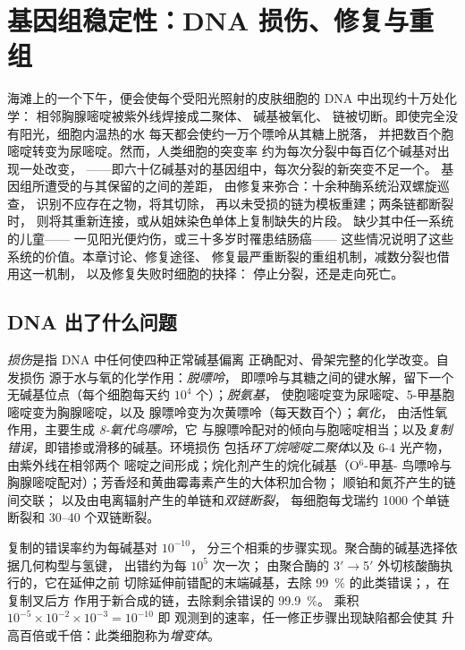 \chapter{基因组稳定性：DNA 损伤、修复与重组}\label{ch:b3:dna-repair}

海滩上的一个下午，便会使每个受阳光照射的皮肤细胞的 DNA 中出现约十万处化学：
相邻胸腺嘧啶被紫外线焊接成二聚体、
碱基被氧化、
链被切断。即使完全没有阳光，细胞内温热的水
每天都会使约一万个嘌呤从其糖上脱落，
并把数百个胞嘧啶转变为尿嘧啶。然而，人类细胞的突变率
约为每次分裂中每百亿个碱基对出现一处改变，
——即六十亿碱基对的基因组中，每次分裂的新突变不足一个。
基因组所遭受的与其保留的之间的差距，
由修复来弥合：十余种酶系统沿双螺旋巡查，
识别不应存在之物，将其切除，
再以未受损的链为模板重建；两条链都断裂时，
则将其重新连接，或从姐妹染色单体上复制缺失的片段。
缺少其中任一系统的儿童——
一见阳光便灼伤，或三十多岁时罹患结肠癌——
这些情况说明了这些系统的价值。本章讨论、修复途径、
修复最严重断裂的重组机制，减数分裂也借用这一机制，
以及修复失败时细胞的抉择：
停止分裂，还是走向死亡。

\section{DNA 出了什么问题}

\begin{definition}[DNA 损伤]\label{def:b3:dna-repair:lesions}
\emph{损伤}是指 DNA 中任何使四种正常碱基偏离
正确配对、骨架完整的化学改变。自发损伤
源于水与氧的化学作用：\emph{脱嘌呤}，
即嘌呤与其糖之间的键水解，留下一个
无碱基位点（每个细胞每天约 $10^{4}$ 个）；\emph{脱氨基}，
使胞嘧啶变为尿嘧啶、5-甲基胞嘧啶变为胸腺嘧啶，以及
腺嘌呤变为次黄嘌呤（每天数百个）；\emph{氧化}，
由活性氧作用，主要生成 \emph{8-氧代鸟嘌呤}，它
与腺嘌呤配对的倾向与胞嘧啶相当；以及\emph{复制
错误}，即错掺或滑移的碱基。环境损伤
包括\emph{环丁烷嘧啶二聚体}以及 6-4
光产物，由紫外线在相邻两个
嘧啶之间形成；烷化剂产生的烷化碱基（O$^{6}$-甲基-
鸟嘌呤与胸腺嘧啶配对）；芳香烃和黄曲霉毒素产生的大体积加合物；
顺铂和氮芥产生的链间交联；
以及由电离辐射产生的单链和\emph{双链断裂}，
每细胞每戈瑞约 \num{1000} 个单链断裂和
\numrange{30}{40} 个双链断裂。
\end{definition}

\begin{proposition}[保真度阶梯]\label{prop:b3:dna-repair:fidelity}
复制的错误率约为每碱基对 $10^{-10}$，
分三个相乘的步骤实现。聚合酶的碱基选择依据几何构型与氢键，
出错约为每 $10^{5}$ 次一次；
由聚合酶的 3$'\to$5$'$ 外切核酸酶执行的\emph{}，它在延伸之前
切除延伸前错配的末端碱基，去除
\qty{99}{\%} 的此类错误；\emph{}，在复制叉后方
作用于新合成的链，去除剩余错误的 \qty{99.9}{\%}。
乘积 $10^{-5}\times 10^{-2}\times 10^{-3} = 10^{-10}$ 即
观测到的速率，任一修正步骤出现缺陷都会使其
升高百倍或千倍：此类细胞称为\emph{增变体}。
\end{proposition}

